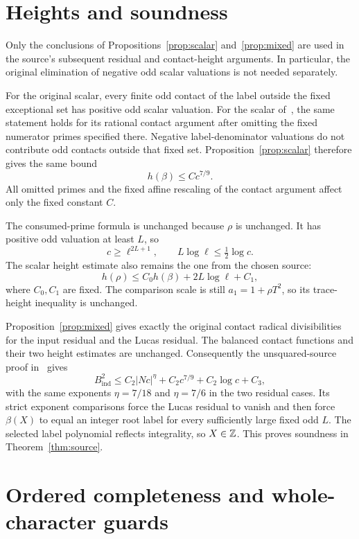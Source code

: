 \documentclass[11pt,a4paper]{article}
\begin{document}
\section{Heights and soundness}

Only the conclusions of Propositions~\ref{prop:scalar}
and~\ref{prop:mixed} are used in the source's subsequent residual
and contact-height arguments. In particular, the original elimination
of negative odd scalar valuations is not needed separately.

For the original scalar, every finite odd contact of the label outside
the fixed exceptional set has positive odd scalar valuation. For the
scalar of~\cite{Aligned}, the same statement holds for its rational
contact argument after omitting the fixed numerator primes specified
there. Negative label-denominator valuations do not contribute odd
contacts outside that fixed set. Proposition~\ref{prop:scalar}
therefore gives the same bound
\[
                         h(\beta)\le Cc^{7/9}.
\]
All omitted primes and the fixed affine rescaling of the contact
argument affect only the fixed constant $C$.

The consumed-prime formula is unchanged because $\rho$ is unchanged.
It has positive odd valuation at least $L$, so
\[
                 c\ge\ell^{2L+1},\qquad
                 L\log\ell\le\tfrac12\log c.
\]
The scalar height estimate also remains the one from the chosen source:
\[
                  h(\rho)\le C_0h(\beta)+2L\log\ell+C_1,
\]
where $C_0,C_1$ are fixed. The comparison scale is still
$a_1=1+\rho T^2$, so its trace-height inequality is unchanged.

Proposition~\ref{prop:mixed} gives exactly the original contact
radical divisibilities for the input residual and the Lucas residual.
The balanced contact functions and their two height estimates are
unchanged. Consequently the unsquared-source proof in~\cite{Unit}
gives
\[
 B_{\mathrm{ind}}^2\le C_2|Nc|^\eta
             +C_2c^{7/9}+C_2\log c+C_3,
\]
with the same exponents $\eta=7/18$ and $\eta=7/6$ in the two
residual cases. Its strict exponent comparisons force the Lucas
residual to vanish and then force $\beta(X)$ to equal an integer
root label for every sufficiently large fixed odd $L$.
The selected label polynomial reflects integrality, so $X\in\mathbb Z$.
This proves soundness in Theorem~\ref{thm:source}.

\section{Ordered completeness and whole-character guards}
\end{document}
